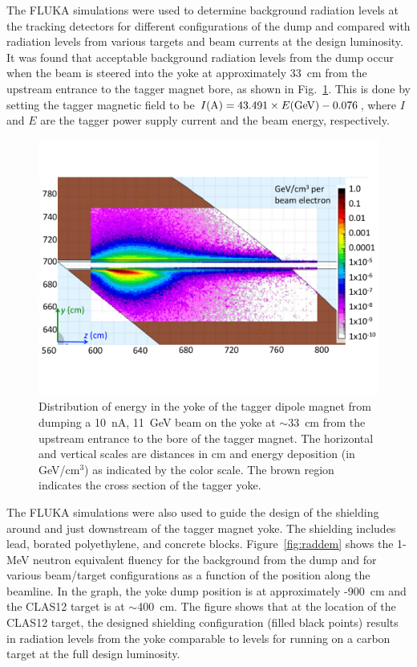 The FLUKA simulations were used to determine background radiation levels at the tracking detectors for different
configurations of the dump and compared with radiation levels from various targets and beam currents at the design
luminosity.  It was found that acceptable background radiation levels from the dump occur when the beam is steered
into the yoke at approximately 33~cm from the upstream entrance to the tagger magnet bore, as shown in
Fig.~\ref{fig:yokedump}. This is done by setting the tagger magnetic field to be
$I({\rm A}) = 43.491\times E({\rm GeV}) - 0.076$, where $I$ and $E$ are the tagger power supply current and
the beam energy, respectively.   
%
\begin{figure}[hbt]
\begin{center}
\includegraphics[width=.45\textwidth]{YokeDump.pdf}
\caption{Distribution of energy in the yoke of the tagger dipole magnet from dumping a 10~nA, 11~GeV beam
  on the yoke at $\sim$33~cm from the upstream entrance to the bore of the tagger magnet. The horizontal and
  vertical scales are distances in cm and energy deposition (in GeV/cm$^3$) as indicated by the color scale. The
  brown region indicates the cross section of the tagger yoke.}
\label{fig:yokedump}
\end{center}
\end{figure}

The FLUKA simulations were also used to guide the design of the shielding around and just downstream of the
tagger magnet yoke. The shielding includes lead, borated polyethylene, and concrete blocks.
Figure~\ref{fig:raddem} shows the 1-MeV neutron equivalent fluency for the background from the dump and for
various beam/target configurations as a function of the position along the beamline. In the graph, the yoke dump
position is at approximately -900~cm and the CLAS12 target is at $\sim$400~cm. The figure shows that at the
location of the CLAS12 target, the designed shielding configuration (filled black points) results in radiation levels
from the yoke comparable to levels for running on a carbon target at the full design luminosity.   

